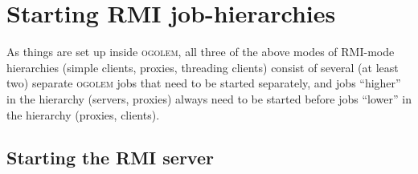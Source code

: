 \documentclass[a4paper,10pt]{scrbook}
\newcommand{\ogo}{\textsc{ogolem}}
\begin{document}
\section{Starting RMI job-hierarchies}

As things are set up inside \ogo{}, all three of the above modes of RMI-mode
hierarchies (simple clients, proxies, threading clients) consist of several
(at least two) separate \ogo{} jobs that need 
to be started separately, and jobs ``higher'' in the hierarchy (servers,
proxies) always need to be started before jobs ``lower'' in the hierarchy
(proxies, clients). 

\subsection{Starting the RMI server}
\end{document}
